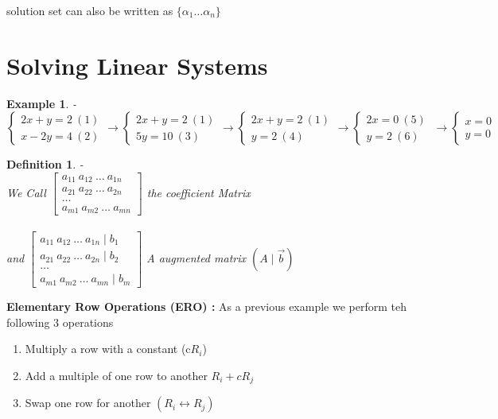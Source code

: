 \documentclass{article}
\newtheorem{ex}[theorem]{Example}
\newtheorem{definition}[theorem]{Definition}
\begin{document}
solution set  can also be written as \( \{ \alpha_1 \ldots \alpha_n \} \)

\section{Solving Linear Systems}

\begin{ex} - \\
\[ \begin{cases} 2x + y = 2 \ (1) \\ x-2y = 4 \ (2) \end{cases} \rightarrow \begin{cases} 2x+y = 2 \ (1) \\ 5y = 10 \ (3) \end{cases} \rightarrow \begin{cases} 2x+y = 2 \ (1) \\ y = 2 \ (4) \end{cases} \rightarrow \begin{cases} 2x = 0 \ (5) \  \\ y = 2 \ (6)  \end{cases} \rightarrow \begin{cases} x = 0  \\ y = 0  \end{cases} \]
\end{ex}
\begin{definition} -\\
We Call  \(\begin{bmatrix} a_{11}  \ a_{12} \ \ldots \ a_{1n} \\ a_{21}  \ a_{22} \ \ldots \ a_{2n}  \\ \ldots \\ a_{m1}  \ a_{m2} \ \ldots \ a_{mn} \end{bmatrix} \) the coefficient Matrix \\
\\
and \(\begin{bmatrix} a_{11}  \ a_{12} \ \ldots \ a_{1n} \mid b_1 \\ a_{21}  \ a_{22} \ \ldots \ a_{2n} \mid b_2  \\ \ldots \\ a_{m1}  \ a_{m2} \ \ldots \ a_{mn} \mid b_m\end{bmatrix} \) A augmented matrix \( (A \mid \vec{b} )\)
\end{definition}

\textbf{Elementary Row Operations (ERO) : } As a previous example we perform teh following 3 operations \\
\begin{enumerate}
\item Multiply a row with a constant (c\(R_i\)) 
\item Add a multiple of one row to another \( R_i + cR_j\)
\item Swap one row for another \( (R_i \longleftrightarrow R_j )\)
\end{enumerate}
\end{document}
